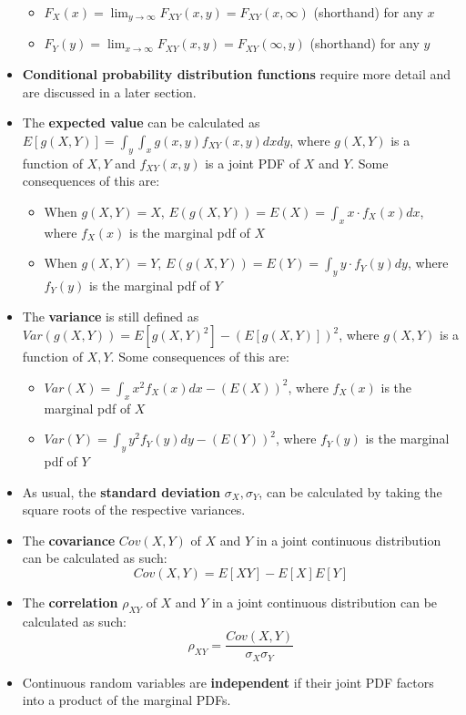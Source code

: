 \documentclass[12pt]{article}
\begin{document}
\begin{itemize}
	      \begin{itemize}
		      \item $F_X(x) = \lim_{y\to\infty}F_{XY}(x, y) = F_{XY} (x, \infty)$ (shorthand) for any $x$
		      \item $F_Y(y) = \lim_{x\to\infty}F_{XY}(x, y) = F_{XY} (\infty, y)$ (shorthand) for any $y$
	      \end{itemize}
	\item \textbf{Conditional probability distribution functions} require more detail and are discussed in a later section.
	\item The \textbf{expected value} can be calculated as $E[g(X, Y)] = \int_{y} \int_{x} g(x, y) f_{XY}(x, y) dx dy$, where $g(X, Y)$ is a
	      function of $X, Y$ and $f_{XY}(x, y)$ is a joint PDF of $X$ and $Y$. Some consequences of this are:
	      \begin{itemize}
		      \item When $g(X, Y) = X$, $E(g(X, Y)) = E(X) = \int_{x} x\cdot f_X(x)dx$, where $f_X(x)$ is the marginal pdf of $X$
		      \item When $g(X, Y) = Y$, $E(g(X, Y)) = E(Y) = \int_{y} y\cdot f_Y(y)dy$, where $f_Y(y)$ is the marginal pdf of $Y$
	      \end{itemize}
	\item The \textbf{variance} is still defined as $Var(g(X, Y)) = E[g(X,
				      Y)^2] - (E[g(X, Y)])^2$, where $g(X, Y)$ is a function of $X, Y$. Some
	      consequences of this are:
	      \begin{itemize}
		      \item $Var(X) = \int_{x} x^2 f_X(x)dx - (E(X))^2$, where $f_X(x)$ is the marginal pdf of $X$
		      \item $Var(Y) = \int_{y} y^2 f_Y(y)dy - (E(Y))^2$, where $f_Y(y)$ is the marginal pdf of $Y$
	      \end{itemize}
	\item As usual, the \textbf{standard deviation} $\sigma_X, \sigma_Y$,
	      can be calculated by taking the square roots of the respective
	      variances.
	\item The \textbf{covariance} $Cov(X, Y)$ of $X$ and $Y$ in a joint continuous distribution can be calculated as such:
	      \[
		      Cov(X, Y) = E[XY] - E[X]E[Y]
	      \]
	\item The \textbf{correlation} $\rho_{XY}$ of $X$ and $Y$ in a joint continuous distribution can be calculated as such:
	      \[
		      \rho_{XY} = \frac{Cov(X, Y)}{\sigma_X \sigma_Y}
	      \]
	\item Continuous random variables are \textbf{independent} if their joint PDF
	      factors into a product of the marginal PDFs.
\end{itemize}
\end{document}
